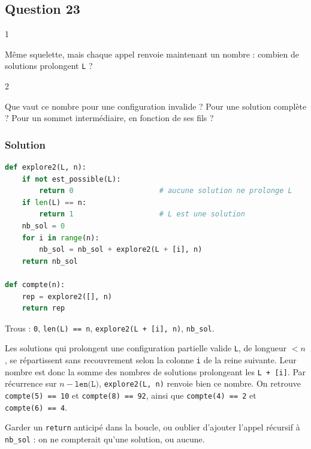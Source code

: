 \documentclass[11pt,a4paper]{article}
\begin{document}
\hypertarget{question-23}{%
\subsection{Question 23}\label{question-23}}

\begin{indication}{1}

Même squelette, mais chaque appel renvoie maintenant un nombre : combien de solutions prolongent \texttt{L} ?

\end{indication}

\begin{indication}{2}

Que vaut ce nombre pour une configuration invalide ? Pour une solution complète ? Pour un sommet intermédiaire, en fonction de ses fils ?

\end{indication}

\hypertarget{solution-22}{%
\subsubsection{Solution}\label{solution-22}}

\begin{lstlisting}[language=Python]
def explore2(L, n):
    if not est_possible(L):
        return 0                    # aucune solution ne prolonge L
    if len(L) == n:
        return 1                    # L est une solution
    nb_sol = 0
    for i in range(n):
        nb_sol = nb_sol + explore2(L + [i], n)
    return nb_sol

def compte(n):
    rep = explore2([], n)
    return rep
\end{lstlisting}

Trous : \texttt{0}, \texttt{len(L)\ ==\ n}, \texttt{explore2(\allowbreak{}L\ +\ {[}i{]}\allowbreak{},\allowbreak{}\ n)\allowbreak{}}, \texttt{nb\_sol}.

Les solutions qui prolongent une configuration partielle valide \texttt{L}, de longueur \(< n\), se répartissent sans recouvrement selon la colonne \texttt{i} de la reine suivante. Leur nombre est donc la somme des nombres de solutions prolongeant les \texttt{L\ +\ {[}i{]}}. Par récurrence sur \(n - \texttt{len(L)}\), \texttt{explore2(L,\ n)} renvoie bien ce nombre. On retrouve \texttt{compte(5)\ ==\ 10} et \texttt{compte(8)\ ==\ 92}, ainsi que \texttt{compte(4)\ ==\ 2} et \texttt{compte(6)\ ==\ 4}.

\begin{piege}

Garder un \texttt{return} anticipé dans la boucle, ou oublier d'ajouter l'appel récursif à \texttt{nb\_sol} : on ne compterait qu'une solution, ou aucune.

\end{piege}
\end{document}
